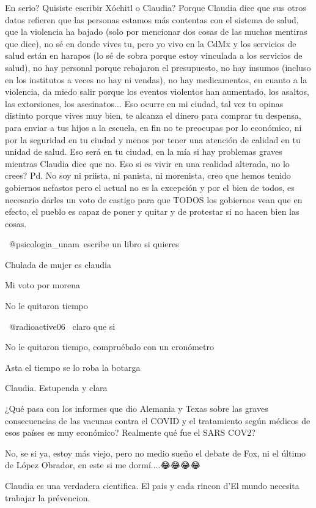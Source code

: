 En serio? Quisiste escribir Xóchitl o Claudia? Porque Claudia dice que sus otros datos refieren que las personas estamos más contentas con el sistema de salud, que la violencia ha bajado (solo por mencionar dos cosas de las muchas mentiras que dice), no sé en donde vives tu, pero yo vivo en la CdMx y los servicios de salud están en harapos (lo sé de sobra porque estoy vinculada a los servicios de salud), no hay personal porque rebajaron el presupuesto, no hay insumos (incluso en los institutos a veces no hay ni vendas), no hay medicamentos, en cuanto a la violencia, da miedo salir porque los eventos violentos han aumentado, los asaltos, las extorsiones, los asesinatos... Eso ocurre en mi ciudad, tal vez tu opinas distinto porque vives muy bien, te alcanza el dinero para comprar tu despensa, para enviar a tus hijos a la escuela, en fin no te preocupas por lo económico, ni por la seguridad en tu ciudad y menos por tener una atención de calidad en tu unidad de salud. Eso será en tu ciudad, en la mía si hay problemas graves mientras Claudia dice que no. Eso si es vivir en una realidad alterada, no lo crees?
Pd. No soy ni priista, ni panista, ni morenista, creo que hemos tenido gobiernos nefastos pero el actual no es la excepción y por el bien de todos, es necesario darles un voto de castigo para que TODOS los gobiernos vean que en efecto, el pueblo es capaz de poner y quitar y de protestar si no hacen bien las cosas.

 @psicologia_unam escribe un libro si quieres

Chulada de mujer es claudia

Mi voto por morena

No le quitaron tiempo

 @radioactive06  claro que si

No le quitaron tiempo, compruébalo con un cronómetro

Asta el tiempo  se lo roba la botarga

Claudia. Estupenda y clara

¿Qué pasa con los informes que dio Alemania y Texas sobre las graves consecuencias de las vacunas contra el COVID y el tratamiento según médicos de esos países es muy económico? Realmente qué fue el SARS COV2?

No, se si ya, estoy más viejo, pero no medio sueño el debate de Fox, ni el último de López Obrador, en este si me dormí....😂😂😂😂

Claudia es una verdadera cientifica. El pais y cada rincon d'El mundo necesita trabajar la prévencion.


